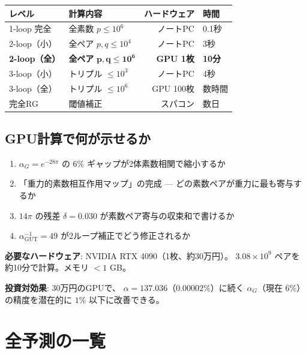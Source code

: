 \documentclass[11pt,a4paper]{article}
\begin{document}
\begin{center}
\begin{tabular}{llrl}
\toprule
レベル & 計算内容 & ハードウェア & 時間 \\
\midrule
1-loop 完全 & 全素数 $p \leq 10^6$ & ノートPC & 0.1秒 \\
2-loop（小） & 全ペア $p,q \leq 10^4$ & ノートPC & 3秒 \\
\textbf{2-loop（全）} & \textbf{全ペア} $\bm{p,q \leq 10^6}$ & \textbf{GPU 1枚} & \textbf{10分} \\
3-loop（小） & トリプル $\leq 10^3$ & ノートPC & 4秒 \\
3-loop（全） & トリプル $\leq 10^6$ & GPU 100枚 & 数時間 \\
完全RG & 閾値補正 & スパコン & 数日 \\
\bottomrule
\end{tabular}
\end{center}

\subsection{GPU計算で何が示せるか}

\begin{enumerate}
\item $\alpha_G = e^{-28\pi}$ の $6\%$ ギャップが2体素数相関で縮小するか
\item 「重力的素数相互作用マップ」の完成 — どの素数ペアが重力に最も寄与するか
\item $14\pi$ の残差 $\delta = 0.030$ が素数ペア寄与の収束和で書けるか
\item $\alpha_{\mathrm{GUT}}^{-1} = 49$ が2ループ補正でどう修正されるか
\end{enumerate}

\textbf{必要なハードウェア}: NVIDIA RTX 4090（1枚、約30万円）。
$3.08 \times 10^9$ ペアを約10分で計算。メモリ $< 1$ GB。

\textbf{投資対効果}: 30万円のGPUで、
$\alpha = 137.036$（$0.00002\%$）に続く
$\alpha_G$（現在 $6\%$）の精度を潜在的に $1\%$ 以下に改善できる。

\section{全予測の一覧}
\end{document}
